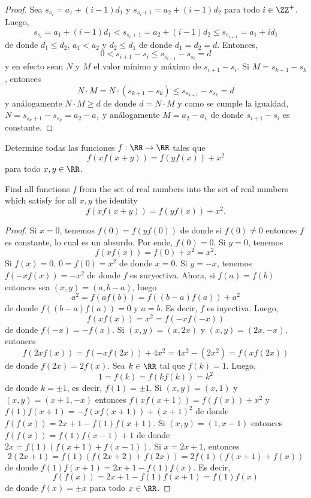\begin{proof}
	Sea $s_{s_i}=a_1+(i-1)d_1$ y $s_{s_i+1}=a_2+(i-1)d_2$ para todo $i\in\ZZ^+$. Luego,
	\[s_{s_i}=a_1+(i-1)d_1<s_{s_i+1}=a_2+(i-1)d_2\le s_{s_{i+1}}=a_1+id_1\]
	de donde $d_1\le d_2$, $a_1<a_2$ y $d_2\le d_1$ de donde $d_1=d_2=d$. Entonces,
	\[0<s_{i+1}-s_i\le s_{s_{i+1}}-s_{s_i}=d\]
	y en efecto sean $N$ y $M$ el valor mínimo y máximo de $s_{i+1}-s_i$. Si $M=s_{k+1}-s_k$, entonces
	\[N\cdot M=N\cdot(s_{k+1}-s_k)\le s_{s_{k+1}}-s_{s_k}=d\]
	y análogamente $N\cdot M\ge d$ de donde $d=N\cdot M$ y como se cumple la igualdad, $N=s_{s_k+1}-s_{s_k}=a_2-a_1$ y análogamente $M=a_2-a_1$ de donde $s_{i+1}-s_i$ es constante.
\end{proof}

\begin{probMG}[ISL 2009/A7]
	Determine todas las funciones $f:\RR\to\RR$ tales que
	\[f(xf(x+y))=f(yf(x))+x^2\]
	para todo $x,y\in\RR$.
	\begin{hint}
		Find all functions $f$ from the set of real numbers into the set of real numbers which satisfy for all $x,y$ the identity
		\[f(xf(x+y))=f(yf(x))+x^2.\]
	\end{hint}
\end{probMG}

\begin{proof}
	Si $x=0$, tenemos $f(0)=f(yf(0))$ de donde si $f(0)\ne 0$ entonces $f$ es constante, lo cual es un absurdo. Por ende, $f(0)=0$. Si $y=0$, tenemos
	\[f(xf(x))=f(0)+x^2=x^2.\]
	Si $f(x)=0$, $0=f(0)=x^2$ de donde $x=0$. Si $y=-x$, tenemos $f(-xf(x))=-x^2$ de donde $f$ es suryectiva. Ahora, si $f(a)=f(b)$ entonces sea $(x,y)=(a,b-a)$, luego
	\[a^2=f(af(b))=f((b-a)f(a))+a^2\]
	de donde $f((b-a)f(a))=0$ y $a=b$. Es decir, $f$ es inyectiva. Luego,
	\[f(xf(x))=x^2=f(-xf(-x))\]
	de donde $f(-x)=-f(x)$. Si $(x,y)=(x,2x)$ y $(x,y)=(2x,-x)$, entonces
	\[f(2xf(x))=f(-xf(2x))+4x^2=4x^2-(2x^2)=f(xf(2x))\]
	de donde $f(2x)=2f(x)$. Sea $k\in\RR$ tal que $f(k)=1$. Luego,
	\[1=f(k)=f(kf(k))=k^2\]
	de donde $k=\pm 1$, es decir, $f(1)=\pm 1$. Si $(x,y)=(x,1)$ y $(x,y)=(x+1,-x)$ entonces $f(xf(x+1))=f(f(x))+x^2$ y $f(1)f(x+1)=-f(xf(x+1))+(x+1)^2$ de donde $f(f(x))=2x+1-f(1)f(x+1)$. Si $(x,y)=(1,x-1)$ entonces $f(f(x))=f(1)f(x-1)+1$ de donde $2x=f(1)(f(x+1)+f(x-1))$. Si $x=2x+1$, entonces
	\[2(2x+1)=f(1)(f(2x+2)+f(2x))=2f(1)(f(x+1)+f(x))\]
	de donde $f(1)f(x+1)=2x+1-f(1)f(x)$. Es decir,
	\[f(f(x))=2x+1-f(1)f(x+1)=f(1)f(x)\]
	de donde $f(x)=\pm x$ para todo $x\in\RR$.
\end{proof}

